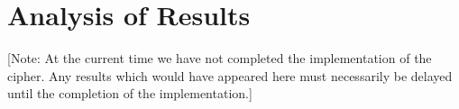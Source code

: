 \section{Analysis of Results}

[Note: At the current time we have not completed the implementation of the cipher. Any results which would have appeared here must necessarily be delayed until the completion of the implementation.]